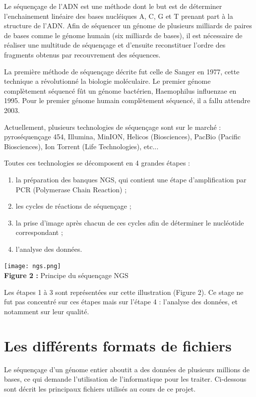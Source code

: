 \documentclass[a4paper,12pt]{article}
\begin{document}
Le séquençage de l'ADN est une méthode dont le but est de déterminer l'enchainement linéaire des bases nucléiques A, C, G et T prenant part à la structure de l'ADN. Afin de séquencer un génome de plusieurs milliards de paires de bases comme le génome humain (six milliards de bases), il est nécessaire de réaliser une multitude de séquençage et d'ensuite reconstituer l'ordre des fragments obtenus par recouvrement des séquences.

La première méthode de séquençage décrite fut celle de Sanger en 1977, cette technique a révolutionné la biologie moléculaire. Le premier génome complètement séquencé fût un génome bactérien, Haemophilus influenzae en 1995. Pour le premier génome humain complètement séquencé, il a fallu attendre 2003. 

Actuellement, plusieurs technologies de séquençage sont sur le marché : pyroséquençage 454, Illumina, MinION, Helicos (Biosciences), PacBio (Pacific Biosciences), Ion Torrent (Life Technologies), etc... 

\clearpage
Toutes ces technologies se décomposent en 4 grandes étapes :
\begin{enumerate}
\item la préparation des banques NGS, qui contient une étape d'amplification par PCR (Polymerase Chain Reaction) ;
\item les cycles de réactions de séquençage ;
\item la prise d'image après chacun de ces cycles afin de déterminer le nucléotide correspondant ;
\item l'analyse des données. 
\end{enumerate}
\begin{center}
\texttt{[image: ngs.png]}~\\
\textbf{Figure 2 :} Principe du séquençage NGS
\end{center}
Les étapes 1 à 3 sont représentées sur cette illustration (Figure 2). Ce stage ne fut pas concentré sur ces étapes mais sur l'étape 4 : l'analyse des données, et notamment sur leur qualité.
\clearpage


\section{Les différents formats de fichiers}

Le séquençage d'un génome entier aboutit a des données de plusieurs millions de bases, ce qui demande l'utilisation de l'informatique pour les traiter. Ci-dessous sont décrit les principaux fichiers utilisés au cours de ce projet. \\
\end{document}
